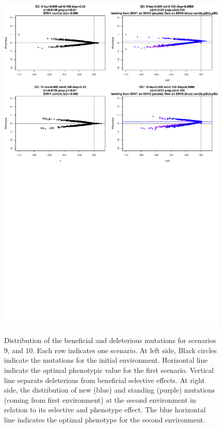 \documentclass[a4paper,11pt]{article}
\begin{document}
\begin{figure}[h]
{\includegraphics[scale=0.45]{./Dist_ALLScenariosv2_3.pdf}}
\caption{Distribution of the beneficial and deleterious mutations for scenarios 9, and 10. Each row indicates one scenario. At left side, Black circles indicate the mutations for the initial environment. Horizontal line indicate the optimal phenotypic value for the first scenario. Vertical line separate deleterious from beneficial selective effects. At right side, the distribution of new (blue) and standing (purple) mutations (coming from first environment) at the second environment in relation to its selective and phenotype effect. The blue horizontal line indicates the optimal phenotype for the second environment.}
\label{DistALLScenariosv23}
\hspace*{-0.5cm}
\end{figure}
\end{document}
